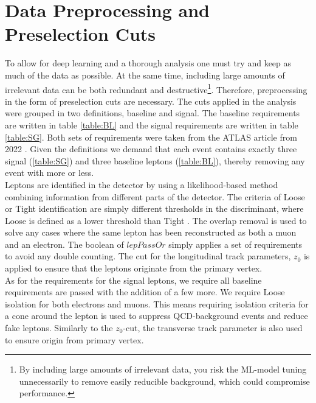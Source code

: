 \section{Data Preprocessing and Preselection Cuts}\label{subsec:Cuts}
To allow for deep learning and a thorough analysis one must try and keep
as much of the data as possible. At the same time, including large amounts
of irrelevant data can be both redundant and destructive\footnote{By including 
large amounts of irrelevant data, you risk the \ac{ML}-model tuning unnecessarily 
to remove easily reducible background, which could compromise performance.}. 
Therefore, preprocessing in the form of preselection cuts are necessary. 
The cuts applied in the analysis were grouped in two definitions, baseline and signal. 
The baseline requirements are written in table \ref{table:BL} and the signal requirements are written 
in table \ref{table:SG}. Both sets of requirements were taken from the \ac{ATLAS} article from 2022 \cite{franchini_search_2019}.
Given the definitions we demand that each event contains exactly three signal (\ref{table:SG}) and 
three baseline leptons (\ref{table:BL}), thereby removing any event with more or less. 
\\
Leptons are identified in the detector by using a likelihood-based method combining
information from different parts of the detector. The criteria of Loose or Tight 
identification are simply different thresholds in the discriminant, where Loose is 
defined as a lower threshold than Tight \cite{Aaboud_2019}. The overlap removal is used to solve any cases
where the same lepton has been reconstructed as both a muon and an electron. The boolean
of $lepPassOr$ simply applies a set of requirements to avoid any double counting. The cut for
the longitudinal track parameters, $z_0$ is applied to ensure that the leptons originate from the 
primary vertex.
\\
As for the requirements for the signal leptons, we require all baseline requirements are passed 
with the addition of a few more. We require Loose isolation for both electrons and muons. This means
requiring isolation criteria for a cone around the lepton is used to suppress \ac{QCD}-background events
and reduce fake leptons. Similarly to the $z_0$-cut, the transverse track parameter is also used to ensure 
origin from primary vertex.
